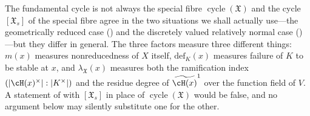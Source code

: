 \begin{warning}{The fundamental cycle is not always the special fibre}
$\operatorname{cycle}(\mathfrak X)$ and the cycle $[\mathfrak X_s]$ of
the special fibre agree in the two situations we shall actually use---the
geometrically reduced case () and the
discretely valued relatively normal case
()---but they differ in general.  The three
factors measure three different things: $m(x)$ measures nonreducedness of
$X$ itself, $\mathrm{def}_K(x)$ measures failure of $K$ to be stable
at $x$, and $\lambda_{\mathfrak X}(x)$ measures both the ramification
index $(|\cH(x)^\times|:|K^\times|)$ and the residue degree of
$\widetilde{\cH(x)}^1$ over the function field of $V$.  A statement of
 with $[\mathfrak X_s]$ in place of
$\operatorname{cycle}(\mathfrak X)$ would be false, and no argument below
may silently substitute one for the other.
\end{warning}

